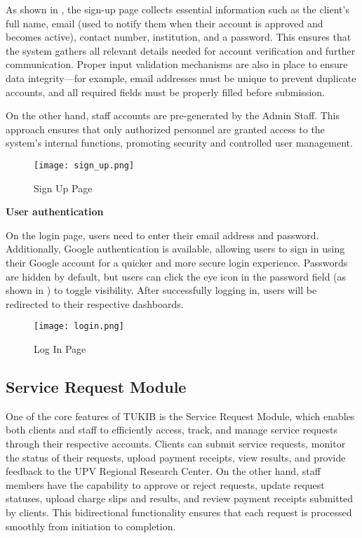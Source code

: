 As shown in , the sign-up page collects essential information such as the client's full name, email (used to notify them when their account is approved and becomes active), contact number, institution, and a password. This ensures that the system gathers all relevant details needed for account verification and further communication. Proper input validation mechanisms are also in place to ensure data integrity—for example, email addresses must be unique to prevent duplicate accounts, and all required fields must be properly filled before submission.

On the other hand, staff accounts are pre-generated by the Admin Staff. This approach ensures that only authorized personnel are granted access to the system’s internal functions, promoting security and controlled user management.

\newpage

\begin{figure}[h]
	\centering 
	\texttt{[image: sign\_up.png]}
	\caption{Sign Up Page}
	\label{fig:signup_page}
\end{figure}

\textbf{User authentication}

On the login page, users need to enter their email address and password. Additionally, Google authentication is available, allowing users to sign in using their Google account for a quicker and more secure login experience. Passwords are hidden by default, but users can click the eye icon in the password field (as shown in ) to toggle visibility. After successfully logging in, users will be redirected to their respective dashboards.

\newpage

\begin{figure}[h]
	\centering 
	\texttt{[image: login.png]}
	\caption{Log In Page}
	\label{fig:login}
\end{figure}

\subsection{Service Request Module}

One of the core features of TUKIB is the Service Request Module, which enables both clients and staff to efficiently access, track, and manage service requests through their respective accounts. Clients can submit service requests, monitor the status of their requests, upload payment receipts, view results, and provide feedback to the UPV Regional Research Center. On the other hand, staff members have the capability to approve or reject requests, update request statuses, upload charge slips and results, and review payment receipts submitted by clients. This bidirectional functionality ensures that each request is processed smoothly from initiation to completion.

